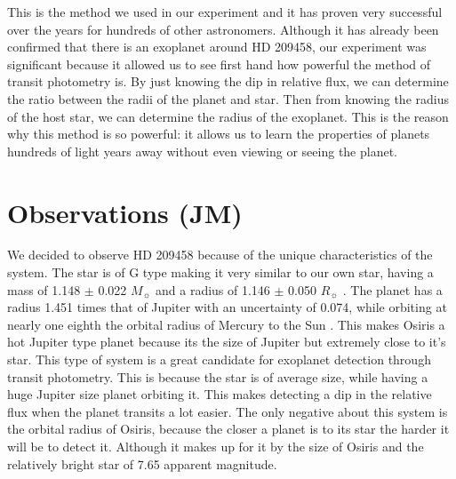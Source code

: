 \documentclass{aastex61}
\begin{document}
This is the method we used in our experiment and it has proven very successful over the years for hundreds of other astronomers. Although it has already been confirmed that there is an exoplanet around HD 209458, our experiment was significant because it allowed us to see first hand how powerful the method of transit photometry is. By just knowing the dip in relative flux, we can determine the ratio between the radii of the planet and star. Then from knowing the radius of the host star, we can determine the radius of the exoplanet. This is the reason why this method is so powerful: it allows us to learn the properties of planets hundreds of light years away without even viewing or seeing the planet. 

\section{Observations (JM)}
We decided to observe HD 209458 because of the unique characteristics of the system. The star is of G type making it very similar to our own star, having a mass of 1.148 $\pm$ 0.022 $M_\sun$ \citep{2010MNRAS.408.1689S} and a radius of 1.146 $\pm$ 0.050 $R_\sun$ \citep{2001ApJ...552..699B}. The planet has a radius 1.451 times that of Jupiter with an uncertainty of 0.074, while orbiting at nearly one eighth the orbital radius of Mercury to the Sun \citep{2015MNRAS.447..846B}. This makes Osiris a hot Jupiter type planet because its the size of Jupiter but extremely close to it's star. This type of system is a great candidate for exoplanet detection through transit photometry. This is because the star is of average size, while having a huge Jupiter size planet orbiting it. This makes detecting a dip in the relative flux when the planet transits a lot easier. The only negative about this system is the orbital radius of Osiris, because the closer a planet is to its star the harder it will be to detect it. Although it makes up for it by the size of Osiris and the relatively bright star of 7.65 apparent magnitude.
\end{document}

